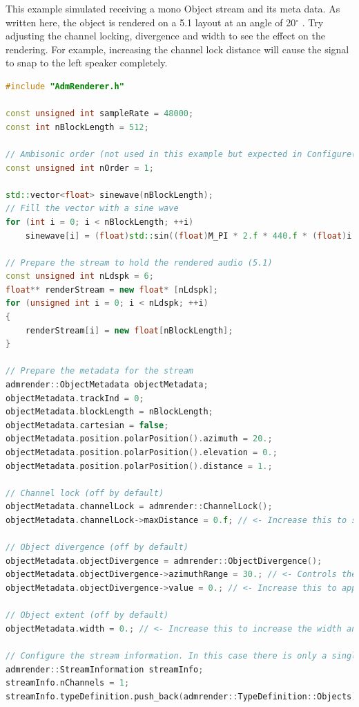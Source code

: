 \documentclass[12pt]{report}
\def\deg{$^{\circ}$ }
\begin{document}
This example simulated receiving a mono Object stream and its meta data.
As written here, the object is rendered on a 5.1 layout at an angle of 20\deg. Try adjusting the channel locking, divergence and width to see the effect on the rendering.
For example, increasing the channel lock distance will cause the signal to snap to the left speaker completely.

\begin{lstlisting}[language=C++]
#include "AdmRenderer.h"

const unsigned int sampleRate = 48000;
const int nBlockLength = 512;

// Ambisonic order (not used in this example but expected in Configure())
const unsigned int nOrder = 1;

std::vector<float> sinewave(nBlockLength);
// Fill the vector with a sine wave
for (int i = 0; i < nBlockLength; ++i)
    sinewave[i] = (float)std::sin((float)M_PI * 2.f * 440.f * (float)i / (float)sampleRate);

// Prepare the stream to hold the rendered audio (5.1)
const unsigned int nLdspk = 6;
float** renderStream = new float* [nLdspk];
for (unsigned int i = 0; i < nLdspk; ++i)
{
    renderStream[i] = new float[nBlockLength];
}

// Prepare the metadata for the stream
admrender::ObjectMetadata objectMetadata;
objectMetadata.trackInd = 0;
objectMetadata.blockLength = nBlockLength;
objectMetadata.cartesian = false;
objectMetadata.position.polarPosition().azimuth = 20.;
objectMetadata.position.polarPosition().elevation = 0.;
objectMetadata.position.polarPosition().distance = 1.;

// Channel lock (off by default)
objectMetadata.channelLock = admrender::ChannelLock();
objectMetadata.channelLock->maxDistance = 0.f; // <- Increase this to see the signal snap to fully in the left loudspeaker

// Object divergence (off by default)
objectMetadata.objectDivergence = admrender::ObjectDivergence();
objectMetadata.objectDivergence->azimuthRange = 30.; // <- Controls the width of the divergence
objectMetadata.objectDivergence->value = 0.; // <- Increase this to apply object divergence

// Object extent (off by default)
objectMetadata.width = 0.; // <- Increase this to increase the width and spread the Object over more adjacent loudspeakers

// Configure the stream information. In this case there is only a single channel stream
admrender::StreamInformation streamInfo;
streamInfo.nChannels = 1;
streamInfo.typeDefinition.push_back(admrender::TypeDefinition::Objects);


\end{lstlisting}
\end{document}
